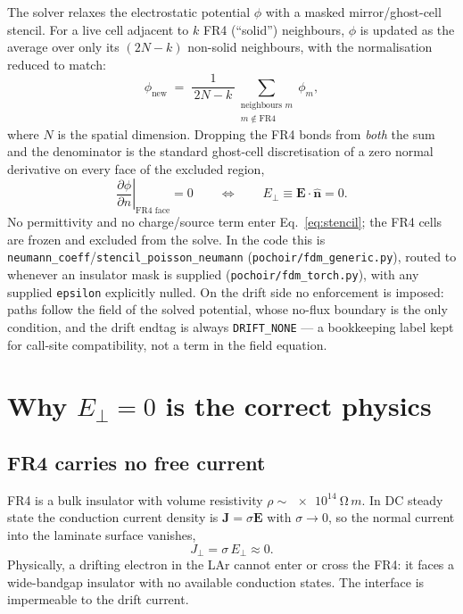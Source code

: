\documentclass[11pt]{article}
\newcommand{\En}{E_{\perp}}
\newcommand{\nhat}{\hat{\mathbf{n}}}
\newcommand{\code}[1]{\texttt{#1}}
\begin{document}
The solver relaxes the electrostatic potential $\phi$ with a masked
mirror/ghost-cell stencil. For a live cell adjacent to $k$ FR4 (``solid'')
neighbours, $\phi$ is updated as the average over only its $(2N-k)$ non-solid
neighbours, with the normalisation reduced to match:
\begin{equation}
  \phi_{\mathrm{new}}
     \;=\;
     \frac{1}{\,2N-k\,}\!\!\sum_{\substack{\text{neighbours }m \\ m\notin\text{FR4}}}\!\!\phi_m ,
  \label{eq:stencil}
\end{equation}
where $N$ is the spatial dimension. Dropping the FR4 bonds from \emph{both} the sum
and the denominator is the standard ghost-cell discretisation of a zero normal
derivative on every face of the excluded region,
\begin{equation}
  \left.\frac{\partial \phi}{\partial n}\right|_{\text{FR4 face}} = 0
  \qquad\Longleftrightarrow\qquad
  \En \equiv \mathbf{E}\cdot\nhat = 0 .
  \label{eq:neumann}
\end{equation}
No permittivity and no charge/source term enter Eq.~\eqref{eq:stencil}; the FR4
cells are frozen and excluded from the solve. In the code this is
\code{neumann\_coeff}/\code{stencil\_poisson\_neumann}
(\code{pochoir/fdm\_generic.py}), routed to whenever an insulator mask is supplied
(\code{pochoir/fdm\_torch.py}), with any supplied \code{epsilon} explicitly nulled.
On the drift side no enforcement is imposed: paths follow the field of the solved
potential, whose no-flux boundary is the only condition, and the drift endtag is
always \code{DRIFT\_NONE} --- a bookkeeping label kept for call-site
compatibility, not a term in the field equation.

\section{Why $\En = 0$ is the correct physics}

\subsection{FR4 carries no free current}
FR4 is a bulk insulator with volume resistivity
$\rho \sim \SI{e14}{\ohm\,m}$. In DC steady state the conduction current density is
$\mathbf{J}=\sigma\mathbf{E}$ with $\sigma\to 0$, so the normal current into the
laminate surface vanishes,
\begin{equation}
  J_\perp = \sigma\,\En \approx 0 .
\end{equation}
Physically, a drifting electron in the LAr cannot enter or cross the FR4: it faces
a wide-bandgap insulator with no available conduction states. The interface is
impermeable to the drift current.
\end{document}

